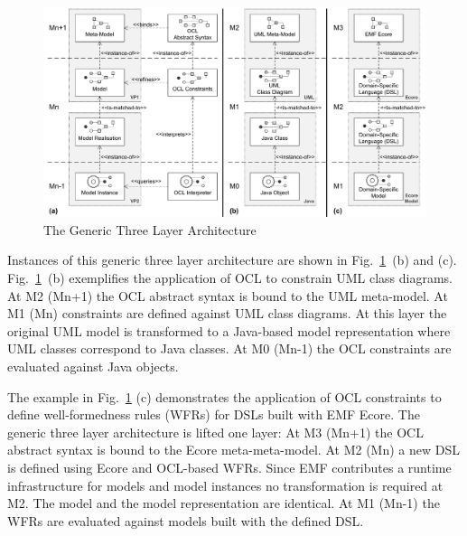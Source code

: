 
	\begin{figure}[t]
			\centering
				\includegraphics[width=1.00\textwidth]{figures/genericlayers.pdf}
			\caption{The Generic Three Layer Architecture}
			\label{fig:genericlayers}
		\end{figure}


Instances of this generic three layer architecture are shown in
Fig.~\ref{fig:genericlayers}~(b) and (c). Fig.~\ref{fig:genericlayers}~(b)
exemplifies the application of OCL to constrain UML class diagrams. At M2 (Mn+1) 
the OCL abstract syntax is bound to the UML meta-model. At M1 (Mn) constraints are defined against UML
class diagrams. At this layer the original UML model is transformed to a
Java-based model representation where UML classes correspond to Java classes.
At M0 (Mn-1) the OCL constraints are evaluated against Java
objects.

The example in Fig.~\ref{fig:genericlayers} (c) demonstrates the
application of OCL constraints to define well-formedness rules (WFRs) for
DSLs built with EMF Ecore. The generic three layer architecture is lifted one
layer: At M3 (Mn+1) the OCL abstract syntax is bound to the Ecore
meta-meta-model. At M2 (Mn) a new DSL is defined using Ecore and OCL-based WFRs. 
Since EMF contributes a runtime infrastructure for models
and model instances no transformation is required at M2. The model and the
model representation are identical. At M1 (Mn-1) the WFRs are
evaluated against models built with the defined DSL.

